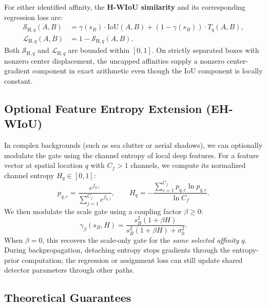 \documentclass[11pt,a4paper]{article}
\begin{document}
For either identified affinity, the \textbf{H-WIoU similarity} and its corresponding regression loss are:
\begin{equation}
  \label{eq:similarity}
  \begin{split}
    \mathcal{S}_{\mathrm{H},q}(A, B) &= \gamma(s_B) \cdot \mathrm{IoU}(A, B) + \left(1 - \gamma(s_B)\right) \cdot T_q(A, B),\\
    \mathcal{L}_{\mathrm{H},q}(A, B) &= 1 - \mathcal{S}_{\mathrm{H},q}(A, B).
  \end{split}
\end{equation}
Both $\mathcal{S}_{\mathrm{H},q}$ and $\mathcal{L}_{\mathrm{H},q}$ are bounded within $[0, 1]$. On strictly separated boxes with nonzero center displacement, the uncapped affinities supply a nonzero center-gradient component in exact arithmetic even though the IoU component is locally constant.

\subsection{Optional Feature Entropy Extension (EH-WIoU)}
\label{sec:entropy_math}
In complex backgrounds (such as sea clutter or aerial shadows), we can optionally modulate the gate using the channel entropy of local deep features. For a feature vector at spatial location $q$ with $C_f>1$ channels, we compute its normalized channel entropy $H_q \in [0, 1]$:
\begin{equation}
  p_{q,c} = \frac{e^{f_{q,c}}}{\sum_{j=1}^{C_f} e^{f_{q,j}}}, \qquad
  H_q = -\frac{\sum_{c=1}^{C_f} p_{q,c} \ln p_{q,c}}{\ln C_f}.
\end{equation}
We then modulate the scale gate using a coupling factor $\beta \ge 0$:
\begin{equation}
  \label{eq:entropy_homotopy}
  \gamma_\beta(s_B, H) = \frac{s_B^2(1 + \beta H)}{s_B^2(1 + \beta H) + \sigma_0^2}.
\end{equation}
When $\beta = 0$, this recovers the scale-only gate for the \emph{same selected affinity} $q$. During backpropagation, detaching entropy stops gradients through the entropy-prior computation; the regression or assignment loss can still update shared detector parameters through other paths.

\subsection{Theoretical Guarantees}
\end{document}
